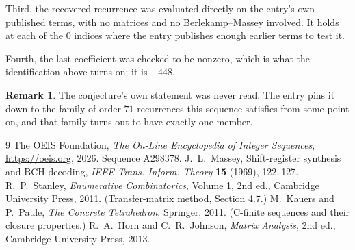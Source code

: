 \documentclass[11pt,a4paper]{article}
\theoremstyle{plain}
\theoremstyle{definition}
\newtheorem{remark}[theorem]{Remark}
\begin{document}
Third, the recovered recurrence was evaluated directly on the entry's own published terms, with
no matrices and no Berlekamp--Massey involved. It holds at each of the $0$ indices where
the entry publishes enough earlier terms to test it.

Fourth, the last coefficient was checked to be nonzero, which is what the identification above
turns on; it is $-448$.

\begin{remark}
The conjecture's own statement was never read. The entry pins it down to the family of
order-$71$ recurrences this sequence satisfies from some point on, and that family turns
out to have exactly one member.
\end{remark}

\begin{thebibliography}{9}
 The OEIS Foundation, \emph{The On-Line Encyclopedia of Integer
Sequences}, \url{https://oeis.org}, 2026. Sequence A298378.
 J.~L.~Massey, Shift-register synthesis and BCH decoding, \emph{IEEE
Trans. Inform. Theory} \textbf{15} (1969), 122--127.
 R.~P.~Stanley, \emph{Enumerative Combinatorics}, Volume 1, 2nd ed.,
Cambridge University Press, 2011. (Transfer-matrix method, Section 4.7.)
 M.~Kauers and P.~Paule, \emph{The Concrete Tetrahedron}, Springer, 2011.
(C-finite sequences and their closure properties.)
 R.~A.~Horn and C.~R.~Johnson, \emph{Matrix Analysis}, 2nd ed., Cambridge
University Press, 2013.
\end{thebibliography}
\end{document}
